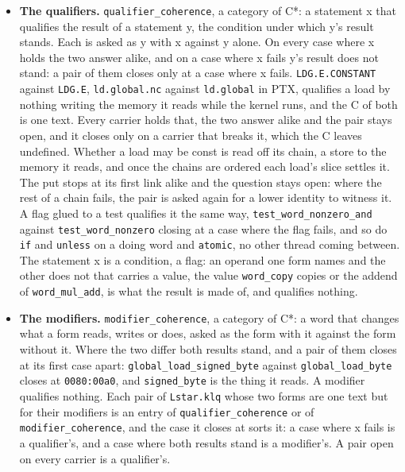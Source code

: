 \begin{itemize}
\item \textbf{The qualifiers.} \texttt{qualifier\_\allowbreak{}coherence}, a category of C*: a statement x that qualifies the result of a statement y, the condition under which y's result stands. Each is asked as y with x against y alone. On every case where x holds the two answer alike, and on a case where x fails y's result does not stand: a pair of them closes only at a case where x fails. \texttt{LDG.\allowbreak{}E.\allowbreak{}CONSTANT} against \texttt{LDG.\allowbreak{}E}, \texttt{ld.\allowbreak{}global.\allowbreak{}nc} against \texttt{ld.\allowbreak{}global} in PTX, qualifies a load by nothing writing the memory it reads while the kernel runs, and the C of both is one text. Every carrier holds that, the two answer alike and the pair stays open, and it closes only on a carrier that breaks it, which the C leaves undefined. Whether a load may be const is read off its chain, a store to the memory it reads, and once the chains are ordered each load's slice settles it. The put stops at its first link alike and the question stays open: where the rest of a chain fails, the pair is asked again for a lower identity to witness it. A flag glued to a test qualifies it the same way, \texttt{test\_\allowbreak{}word\_\allowbreak{}nonzero\_\allowbreak{}and} against \texttt{test\_\allowbreak{}word\_\allowbreak{}nonzero} closing at a case where the flag fails, and so do \texttt{if} and \texttt{unless} on a doing word and \texttt{atomic}, no other thread coming between. The statement x is a condition, a flag: an operand one form names and the other does not that carries a value, the value \texttt{word\_\allowbreak{}copy} copies or the addend of \texttt{word\_\allowbreak{}mul\_\allowbreak{}add}, is what the result is made of, and qualifies nothing.
\item \textbf{The modifiers.} \texttt{modifier\_\allowbreak{}coherence}, a category of C*: a word that changes what a form reads, writes or does, asked as the form with it against the form without it. Where the two differ both results stand, and a pair of them closes at its first case apart: \texttt{global\_\allowbreak{}load\_\allowbreak{}signed\_\allowbreak{}byte} against \texttt{global\_\allowbreak{}load\_\allowbreak{}byte} closes at \texttt{0080:00a0}, and \texttt{signed\_\allowbreak{}byte} is the thing it reads. A modifier qualifies nothing. Each pair of \texttt{Lstar.\allowbreak{}klq} whose two forms are one text but for their modifiers is an entry of \texttt{qualifier\_\allowbreak{}coherence} or of \texttt{modifier\_\allowbreak{}coherence}, and the case it closes at sorts it: a case where x fails is a qualifier's, and a case where both results stand is a modifier's. A pair open on every carrier is a qualifier's.

\end{itemize}
